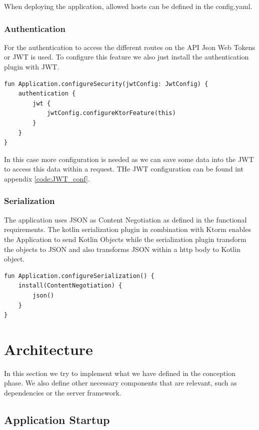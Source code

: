 When deploying the application, allowed hosts can be defined in the config.yaml.

\subsubsection{Authentication}

For the authentication to access the different routes on the API Json Web Tokens or JWT is used. To configure this feature we also just install the authentication plugin with JWT.

\begin{verbatim}
fun Application.configureSecurity(jwtConfig: JwtConfig) {
    authentication {
        jwt {
            jwtConfig.configureKtorFeature(this)
        }
    }
}
\end{verbatim}

In this case more configuration is needed as we can save some data into the JWT to access this data within a request. THe JWT configuration can be found int appendix \ref{code:JWT_conf}.

\subsubsection{Serialization}

The application uses JSON as Content Negotiation as defined in the functional requirements. The kotlin serialization plugin in combination with Ktorm enables the Application to send Kotlin Objects while the serialization plugin transform the objects to JSON and also transforms JSON within a http body to Kotlin object. 

\begin{verbatim}
fun Application.configureSerialization() {
    install(ContentNegotiation) {
        json()
    }
}
\end{verbatim}

\section{Architecture}

In this section we try to implement what we have defined in the conception phase. We also define other necessary components that are relevant, such as dependencies or the server framework. 

\subsection{Application Startup}


